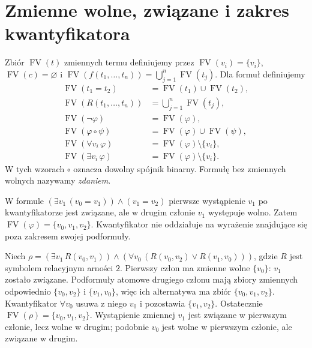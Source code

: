 \section{Zmienne wolne, związane i zakres kwantyfikatora}
\begin{definicja}\label{def:syntax-free-vars}
Zbiór $\operatorname{FV}(t)$ zmiennych termu definiujemy przez
$\operatorname{FV}(v_i)=\{v_i\}$, $\operatorname{FV}(c)=\varnothing$
i
$\operatorname{FV}(f(t_1,\ldots,t_n))=\bigcup_{j=1}^{n}\operatorname{FV}(t_j)$.
Dla formuł definiujemy
\begin{align*}
\operatorname{FV}(t_1=t_2)
  &=\operatorname{FV}(t_1)\cup\operatorname{FV}(t_2),\\
\operatorname{FV}(R(t_1,\ldots,t_n))
  &=\bigcup_{j=1}^{n}\operatorname{FV}(t_j),\\
\operatorname{FV}(\neg\varphi)&=\operatorname{FV}(\varphi),\\
\operatorname{FV}(\varphi\circ\psi)
  &=\operatorname{FV}(\varphi)\cup\operatorname{FV}(\psi),\\
\operatorname{FV}(\forall v_i\,\varphi)
  &=\operatorname{FV}(\varphi)\setminus\{v_i\},\\
\operatorname{FV}(\exists v_i\,\varphi)
  &=\operatorname{FV}(\varphi)\setminus\{v_i\}.
\end{align*}
W tych wzorach $\circ$ oznacza dowolny spójnik binarny.
Formułę bez zmiennych wolnych nazywamy \emph{zdaniem}.
\end{definicja}
\begin{przyklad}
W formule $(\exists v_1\,(v_0=v_1))\land(v_1=v_2)$
pierwsze wystąpienie $v_1$ po kwantyfikatorze jest związane, ale
w drugim członie $v_1$ występuje wolno. Zatem
$\operatorname{FV}(\varphi)=\{v_0,v_1,v_2\}$.
Kwantyfikator nie oddziałuje na wyrażenie znajdujące się poza
zakresem swojej podformuły.
\end{przyklad}

\begin{przyklad}
Niech
$\rho=(\exists v_1\,R(v_0,v_1))\land
 (\forall v_0\,(R(v_0,v_2)\lor R(v_1,v_0)))$,
gdzie $R$ jest symbolem relacyjnym arności $2$.
Pierwszy człon ma zmienne wolne $\{v_0\}$: $v_1$ zostało
związane. Podformuły atomowe drugiego członu mają
zbiory zmiennych odpowiednio $\{v_0,v_2\}$ i
$\{v_1,v_0\}$, więc ich alternatywa ma zbiór
$\{v_0,v_1,v_2\}$. Kwantyfikator $\forall v_0$
usuwa z niego $v_0$ i pozostawia $\{v_1,v_2\}$.
Ostatecznie $\operatorname{FV}(\rho)=\{v_0,v_1,v_2\}$.
Wystąpienie zmiennej $v_1$ jest związane w pierwszym
członie, lecz wolne w drugim; podobnie $v_0$ jest wolne
w pierwszym członie, ale związane w drugim.
\end{przyklad}

